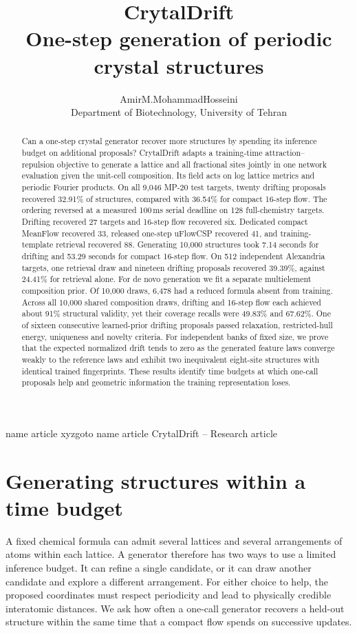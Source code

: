 \documentclass[10pt]{article}
\title{\vspace{-2em}\bfseries CrytalDrift\\[2pt]\large One-step generation of periodic crystal structures}
\author{AmirM.MohammadHosseini\\[-1pt]\small Department of Biotechnology, University of Tehran}
\date{}
\newcommand{\crytalmark}[2]{\pdfdest name {#1} xyz\pdfoutline goto name {#1} {#2}}
\newcommand{\crytalmark}[2]{\pdfbookmark[1]{#2}{#1}}
\begin{document}
\crytalmark{article}{CrytalDrift -- Research article}
\maketitle
\vspace{-1.4em}
\begin{abstract}
Can a one-step crystal generator recover more structures by spending its inference budget on additional proposals? CrytalDrift adapts a training-time attraction--repulsion objective to generate a lattice and all fractional sites jointly in one network evaluation given the unit-cell composition. Its field acts on log lattice metrics and periodic Fourier products. On all 9,046 MP-20 test targets, twenty drifting proposals recovered 32.91\% of structures, compared with 36.54\% for compact 16-step flow. The ordering reversed at a measured 100\,ms serial deadline on 128 full-chemistry targets. Drifting recovered 27 targets and 16-step flow recovered six. Dedicated compact MeanFlow recovered 33, released one-step uFlowCSP recovered 41, and training-template retrieval recovered 88. Generating 10,000 structures took 7.14 seconds for drifting and 53.29 seconds for compact 16-step flow. On 512 independent Alexandria targets, one retrieval draw and nineteen drifting proposals recovered 39.39\%, against 24.41\% for retrieval alone. For de novo generation we fit a separate multielement composition prior. Of 10,000 draws, 6,478 had a reduced formula absent from training. Across all 10,000 shared composition draws, drifting and 16-step flow each achieved about 91\% structural validity, yet their coverage recalls were 49.83\% and 67.62\%. One of sixteen consecutive learned-prior drifting proposals passed relaxation, restricted-hull energy, uniqueness and novelty criteria. For independent banks of fixed size, we prove that the expected normalized drift tends to zero as the generated feature laws converge weakly to the reference laws and exhibit two inequivalent eight-site structures with identical trained fingerprints. These results identify time budgets at which one-call proposals help and geometric information the training representation loses.
\end{abstract}

\section{Generating structures within a time budget}
A fixed chemical formula can admit several lattices and several arrangements of atoms within each lattice. A generator therefore has two ways to use a limited inference budget. It can refine a single candidate, or it can draw another candidate and explore a different arrangement. For either choice to help, the proposed coordinates must respect periodicity and lead to physically credible interatomic distances. We ask how often a one-call generator recovers a held-out structure within the same time that a compact flow spends on successive updates.
\end{document}
